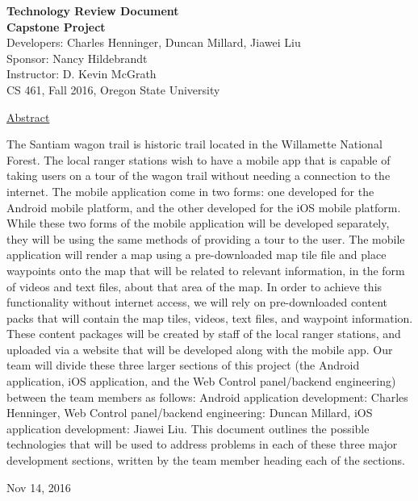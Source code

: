 \documentclass[letterpaper, 10pt,titlepage]{article}
\newcommand\tab[1][1cm]{\hspace*{#1}}
\begin{document}
\begin{titlepage}
\begin{center}
    \Huge
    \textbf{Technology Review Document}\\
    \textbf{Capstone Project}\\
    \vspace{1.0cm}
    \large
    Developers: Charles Henninger, Duncan Millard, Jiawei Liu\\
    Sponsor: Nancy Hildebrandt\\
    \vspace{1.5cm}
    \large
    Instructor: D. Kevin McGrath\\

    \large
    CS 461, Fall 2016, Oregon State University\\    

    \vspace{3.2cm}

    \large
    \underline{Abstract}\\
    \vspace{0.3cm}
    \end{center}
    \large

    \tab The Santiam wagon trail is historic trail located in the Willamette National Forest. The local ranger stations wish to have a mobile app that is capable of taking users on a tour of the wagon trail without needing a connection to the internet. The mobile application come in two forms: one developed for the Android mobile platform, and the other developed for the iOS mobile platform. While these two forms of the mobile application will be developed separately, they will be using the same methods of providing a tour to the user. The mobile application will render a map using a pre-downloaded map tile file and place waypoints onto the map that will be related to relevant information, in the form of videos and text files, about that area of the map. In order to achieve this functionality without internet access, we will rely on pre-downloaded content packs that will contain the map tiles, videos, text files, and waypoint information. These content packages will be created by staff of the local ranger stations, and uploaded via a website that will be developed along with the mobile app. Our team will divide these three larger sections of this project (the Android application, iOS application, and the Web Control panel/backend engineering) between the team members as follows: Android application development: Charles Henninger, Web Control panel/backend engineering: Duncan Millard, iOS application development: Jiawei Liu. This document outlines the possible technologies that will be used to address problems in each of these three major development sections, written by the team member heading each of the sections.
    
    \vspace{0.8cm}
    \vfill
    
\begin{center}    
    Nov 14, 2016

\end{center}
\end{titlepage}
\end{document}
